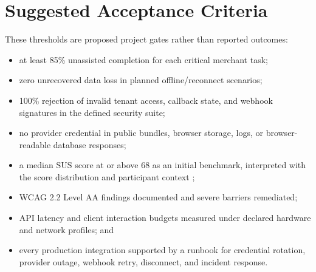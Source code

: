 \documentclass[12pt,oneside]{report}
\begin{document}
\chapter{Suggested Acceptance Criteria}
These thresholds are proposed project gates rather than reported outcomes:

\begin{itemize}
  \item at least 85\% unassisted completion for each critical merchant task;
  \item zero unrecovered data loss in planned offline/reconnect scenarios;
  \item 100\% rejection of invalid tenant access, callback state, and webhook
  signatures in the defined security suite;
  \item no provider credential in public bundles, browser storage, logs, or
  browser-readable database responses;
  \item a median SUS score at or above 68 as an initial benchmark, interpreted
  with the score distribution and participant context
  \parencite{bangor2008sus};
  \item WCAG 2.2 Level AA findings documented and severe barriers remediated;
  \item API latency and client interaction budgets measured under declared
  hardware and network profiles; and
  \item every production integration supported by a runbook for credential
  rotation, provider outage, webhook retry, disconnect, and incident response.
\end{itemize}

\clearpage
\printbibliography[heading=bibintoc,title={References}]
\end{document}
